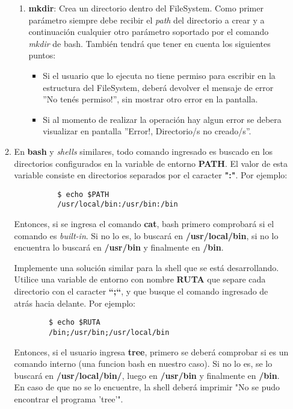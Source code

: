 \begin{enumerate}
\begin{enumerate}
\begin{enumerate}
	     \item \textbf{mkdir}: Crea un directorio dentro del FileSystem. Como primer parámetro siempre debe recibir el \textit{path} del directorio a crear y a continuación cualquier otro parámetro soportado por el comando \emph{mkdir} de bash. También tendrá que tener en cuenta los siguientes puntos:
	     \begin{itemize}
	     	\item Si el usuario que lo ejecuta no tiene permiso para escribir en la estructura del FileSystem, deberá devolver el mensaje de error ”No tenés permiso!”, sin mostrar otro error en la pantalla.
	     	\item Si al momento de realizar la operación hay algun error se debera visualizar en pantalla ”Error!, Directorio/s no creado/s”.
	     \end{itemize}	      
	    \end{enumerate}

	    \item En \textbf{bash} y \textit{shells} similares, todo comando ingresado es buscado en los directorios configurados en la variable de entorno \textbf{PATH}. El valor de esta variable consiste en directorios separados por el caracter \textbf{":"}. Por ejemplo:
	    \begin{lstlisting}
		  $ echo $PATH
		  /usr/local/bin:/usr/bin:/bin
	    \end{lstlisting}
	    
	    Entonces, si se ingresa el comando \textbf{cat}, bash primero comprobará si el comando es \textit{built-in}. Si no lo es, lo buscará en \textbf{/usr/local/bin}, si no lo encuentra lo buscará en \textbf{/usr/bin} y finalmente en \textbf{/bin}.
	    
	    
	    Implemente una solución similar para la shell que se está desarrollando. Utilice una variable de entorno con nombre \textbf{RUTA} que separe cada directorio con el caracter \textbf{``;``}, y que busque el comando ingresado de atrás hacia delante. Por ejemplo:
	    \begin{lstlisting}
		$ echo $RUTA
		/bin;/usr/bin;/usr/local/bin
	    \end{lstlisting}
	    Entonces, si el usuario ingresa \textbf{tree}, primero se deberá comprobar si es un comando interno (una funcion bash en nuestro caso). Si no lo es, se lo buscará en \textbf{/usr/local/bin/}, luego en \textbf{/usr/bin} y finalmente en \textbf{/bin}. En caso de que no se lo encuentre, la shell deberá imprimir "No se pudo encontrar el programa 'tree'".
      \end{enumerate}


\end{enumerate}
